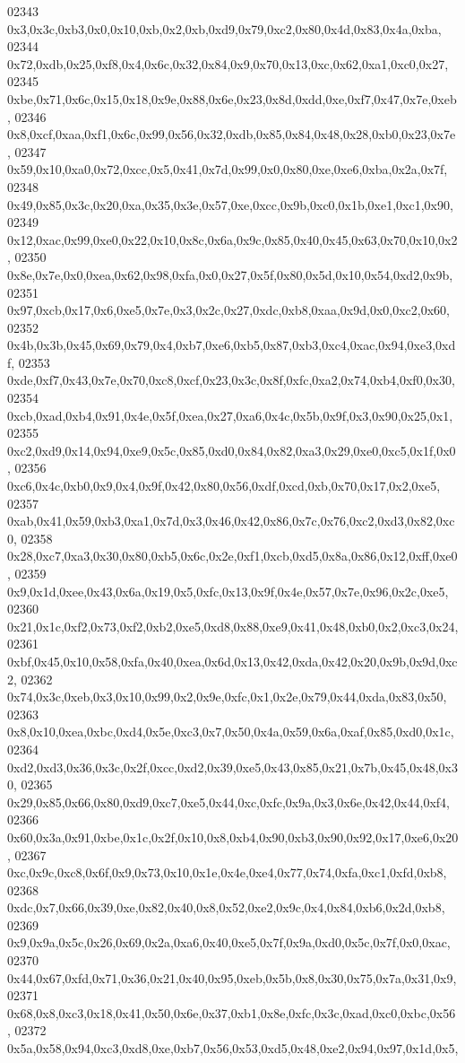 \begin{DoxyCode}
02343   0x3,0x3c,0xb3,0x0,0x10,0xb,0x2,0xb,0xd9,0x79,0xc2,0x80,0x4d,0x83,0x4a,0xba,
02344   0x72,0xdb,0x25,0xf8,0x4,0x6c,0x32,0x84,0x9,0x70,0x13,0xc,0x62,0xa1,0xc0,0x27,
02345   0xbe,0x71,0x6c,0x15,0x18,0x9e,0x88,0x6e,0x23,0x8d,0xdd,0xe,0xf7,0x47,0x7e,0xeb,
02346   0x8,0xcf,0xaa,0xf1,0x6c,0x99,0x56,0x32,0xdb,0x85,0x84,0x48,0x28,0xb0,0x23,0x7e,
02347   0x59,0x10,0xa0,0x72,0xcc,0x5,0x41,0x7d,0x99,0x0,0x80,0xe,0xe6,0xba,0x2a,0x7f,
02348   0x49,0x85,0x3c,0x20,0xa,0x35,0x3e,0x57,0xe,0xcc,0x9b,0xc0,0x1b,0xe1,0xc1,0x90,
02349   0x12,0xac,0x99,0xe0,0x22,0x10,0x8c,0x6a,0x9c,0x85,0x40,0x45,0x63,0x70,0x10,0x2,
02350   0x8e,0x7e,0x0,0xea,0x62,0x98,0xfa,0x0,0x27,0x5f,0x80,0x5d,0x10,0x54,0xd2,0x9b,
02351   0x97,0xcb,0x17,0x6,0xe5,0x7e,0x3,0x2c,0x27,0xdc,0xb8,0xaa,0x9d,0x0,0xc2,0x60,
02352   0x4b,0x3b,0x45,0x69,0x79,0x4,0xb7,0xe6,0xb5,0x87,0xb3,0xc4,0xac,0x94,0xe3,0xdf,
02353   0xde,0xf7,0x43,0x7e,0x70,0xc8,0xcf,0x23,0x3c,0x8f,0xfc,0xa2,0x74,0xb4,0xf0,0x30,
02354   0xcb,0xad,0xb4,0x91,0x4e,0x5f,0xea,0x27,0xa6,0x4c,0x5b,0x9f,0x3,0x90,0x25,0x1,
02355   0xc2,0xd9,0x14,0x94,0xe9,0x5c,0x85,0xd0,0x84,0x82,0xa3,0x29,0xe0,0xc5,0x1f,0x0,
02356   0xc6,0x4c,0xb0,0x9,0x4,0x9f,0x42,0x80,0x56,0xdf,0xcd,0xb,0x70,0x17,0x2,0xe5,
02357   0xab,0x41,0x59,0xb3,0xa1,0x7d,0x3,0x46,0x42,0x86,0x7c,0x76,0xc2,0xd3,0x82,0xc0,
02358   0x28,0xc7,0xa3,0x30,0x80,0xb5,0x6c,0x2e,0xf1,0xcb,0xd5,0x8a,0x86,0x12,0xff,0xe0,
02359   0x9,0x1d,0xee,0x43,0x6a,0x19,0x5,0xfc,0x13,0x9f,0x4e,0x57,0x7e,0x96,0x2c,0xe5,
02360   0x21,0x1c,0xf2,0x73,0xf2,0xb2,0xe5,0xd8,0x88,0xe9,0x41,0x48,0xb0,0x2,0xc3,0x24,
02361   0xbf,0x45,0x10,0x58,0xfa,0x40,0xea,0x6d,0x13,0x42,0xda,0x42,0x20,0x9b,0x9d,0xc2,
02362   0x74,0x3c,0xeb,0x3,0x10,0x99,0x2,0x9e,0xfc,0x1,0x2e,0x79,0x44,0xda,0x83,0x50,
02363   0x8,0x10,0xea,0xbc,0xd4,0x5e,0xc3,0x7,0x50,0x4a,0x59,0x6a,0xaf,0x85,0xd0,0x1c,
02364   0xd2,0xd3,0x36,0x3c,0x2f,0xcc,0xd2,0x39,0xe5,0x43,0x85,0x21,0x7b,0x45,0x48,0x30,
02365   0x29,0x85,0x66,0x80,0xd9,0xc7,0xe5,0x44,0xc,0xfc,0x9a,0x3,0x6e,0x42,0x44,0xf4,
02366   0x60,0x3a,0x91,0xbe,0x1c,0x2f,0x10,0x8,0xb4,0x90,0xb3,0x90,0x92,0x17,0xe6,0x20,
02367   0xc,0x9c,0xc8,0x6f,0x9,0x73,0x10,0x1e,0x4e,0xe4,0x77,0x74,0xfa,0xc1,0xfd,0xb8,
02368   0xdc,0x7,0x66,0x39,0xe,0x82,0x40,0x8,0x52,0xe2,0x9c,0x4,0x84,0xb6,0x2d,0xb8,
02369   0x9,0x9a,0x5c,0x26,0x69,0x2a,0xa6,0x40,0xe5,0x7f,0x9a,0xd0,0x5c,0x7f,0x0,0xac,
02370   0x44,0x67,0xfd,0x71,0x36,0x21,0x40,0x95,0xeb,0x5b,0x8,0x30,0x75,0x7a,0x31,0x9,
02371   0x68,0x8,0xc3,0x18,0x41,0x50,0x6e,0x37,0xb1,0x8e,0xfc,0x3c,0xad,0xc0,0xbc,0x56,
02372   0x5a,0x58,0x94,0xc3,0xd8,0xe,0xb7,0x56,0x53,0xd5,0x48,0xe2,0x94,0x97,0x1d,0x5,

\end{DoxyCode}
